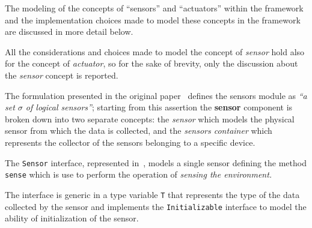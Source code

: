 The modeling of the concepts of ``sensors'' and ``actuators'' within the framework and the implementation choices made to model these concepts in the
framework are discussed in more detail below.

All the considerations and choices made to model the concept of \emph{sensor} hold also for the concept of \emph{actuator}, so for the sake of
brevity, only the discussion about the \emph{sensor} concept is reported.

The formulation presented in the original paper~\cite{fi12110203} defines the sensors module as \textit{``a set $\sigma$ of logical sensors''};
starting from this assertion the \textbf{sensor} component is broken down into two separate concepts: the \emph{sensor} which models the physical
sensor from which the data is collected, and the \emph{sensors container} which represents the collector of the sensors belonging to a specific
device.

The \texttt{Sensor} interface, represented in~, models a single sensor defining the method \texttt{sense} which is use to
perform the operation of \emph{sensing the environment.}



The interface is generic in a type variable \texttt{T} that represents the type of the data collected by the sensor and implements the
\texttt{Initializable} interface to model the ability of initialization of the sensor.

